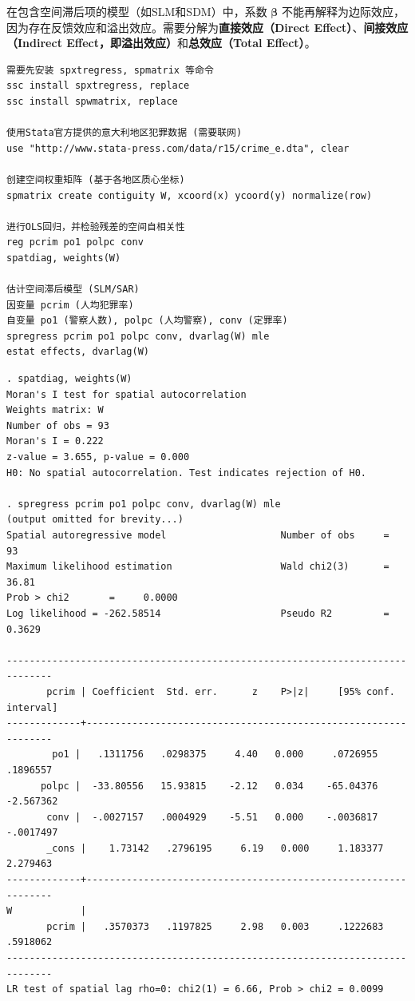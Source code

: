 在包含空间滞后项的模型（如SLM和SDM）中，系数 $\boldsymbol{\beta}$ 不能再解释为边际效应，因为存在反馈效应和溢出效应。需要分解为\textbf{直接效应（Direct Effect）}、\textbf{间接效应（Indirect Effect，即溢出效应）}和\textbf{总效应（Total Effect）}。

\begin{tcolorbox}[title=在 Stata 中估计空间滞后模型 (SLM/SAR), colback=white, colframe=black, colbacktitle=white, coltitle=black,fonttitle=\bfseries]
\begin{lstlisting}[xleftmargin=2em, commentstyle=\color{black}]
需要先安装 spxtregress, spmatrix 等命令
ssc install spxtregress, replace
ssc install spwmatrix, replace

使用Stata官方提供的意大利地区犯罪数据 (需要联网)
use "http://www.stata-press.com/data/r15/crime_e.dta", clear

创建空间权重矩阵 (基于各地区质心坐标)
spmatrix create contiguity W, xcoord(x) ycoord(y) normalize(row)

进行OLS回归，并检验残差的空间自相关性
reg pcrim po1 polpc conv
spatdiag, weights(W)

估计空间滞后模型 (SLM/SAR)
因变量 pcrim (人均犯罪率)
自变量 po1 (警察人数), polpc (人均警察), conv (定罪率)
spregress pcrim po1 polpc conv, dvarlag(W) mle
estat effects, dvarlag(W)
\end{lstlisting}
\vspace{-2em}
\begin{Verbatim}[commandchars=\\\{\},xleftmargin=2em]
. spatdiag, weights(W)
Moran's I test for spatial autocorrelation
Weights matrix: W
Number of obs = 93
Moran's I = 0.222
z-value = 3.655, p-value = 0.000
H0: No spatial autocorrelation. Test indicates rejection of H0.

. spregress pcrim po1 polpc conv, dvarlag(W) mle
(output omitted for brevity...)
Spatial autoregressive model                    Number of obs     =         93
Maximum likelihood estimation                   Wald chi2(3)      =      36.81
Prob > chi2       =     0.0000
Log likelihood = -262.58514                     Pseudo R2         =     0.3629

------------------------------------------------------------------------------
       pcrim | Coefficient  Std. err.      z    P>|z|     [95% conf. interval]
-------------+----------------------------------------------------------------
        po1 |   .1311756   .0298375     4.40   0.000     .0726955    .1896557
      polpc |  -33.80556   15.93815    -2.12   0.034    -65.04376   -2.567362
       conv |  -.0027157   .0004929    -5.51   0.000    -.0036817   -.0017497
       _cons |    1.73142   .2796195     6.19   0.000     1.183377    2.279463
-------------+----------------------------------------------------------------
W            |
       pcrim |   .3570373   .1197825     2.98   0.003     .1222683    .5918062
------------------------------------------------------------------------------
LR test of spatial lag rho=0: chi2(1) = 6.66, Prob > chi2 = 0.0099


\end{Verbatim}
\end{tcolorbox}
